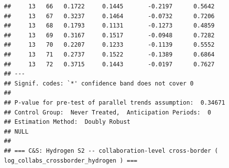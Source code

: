 \documentclass[
]{article}
\begin{document}
\begin{verbatim}
##     13   66   0.1722     0.1445       -0.2197      0.5642  
##     13   67   0.3237     0.1464       -0.0732      0.7206  
##     13   68   0.1793     0.1131       -0.1273      0.4859  
##     13   69   0.3167     0.1517       -0.0948      0.7282  
##     13   70   0.2207     0.1233       -0.1139      0.5552  
##     13   71   0.2737     0.1522       -0.1389      0.6864  
##     13   72   0.3715     0.1443       -0.0197      0.7627  
## ---
## Signif. codes: `*' confidence band does not cover 0
## 
## P-value for pre-test of parallel trends assumption:  0.34671
## Control Group:  Never Treated,  Anticipation Periods:  0
## Estimation Method:  Doubly Robust
## NULL
## 
## === C&S: Hydrogen S2 -- collaboration-level cross-border ( log_collabs_crossborder_hydrogen ) ===
\end{verbatim}
\end{document}
